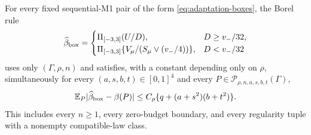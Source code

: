 \begin{proposition}
\label{prop:affine-histogram-adaptation}
For every fixed sequential-M1 pair of the form
\eqref{eq:adaptation-boxes}, the Borel rule
\begin{equation}
 \widehat\beta_{\rm box}=
 \begin{cases}
 \Pi_{[-3,3]}(U/D),&D\ge v_-/32,\\
 \Pi_{[-3,3]}\{V_\mu/(S_\mu\vee(v_-/4))\},&D<v_-/32
 \end{cases}
 \label{eq:adaptation-affine-rule}
\end{equation}
uses only $(\Gamma,\rho,n)$ and satisfies, with a constant depending
only on $\rho$, simultaneously for every $(a,s,b,t)\in[0,1]^4$ and
every $P\in\mathcal P_{\rho,n,a,s,b,t}(\Gamma)$,
\begin{equation}
 \mathbb E_P|\widehat\beta_{\rm box}-\beta(P)|
 \le C_\rho\{q+(a+s^2)(b+t^2)\}.
 \label{eq:adaptation-sharp-risk}
\end{equation}
This includes every $n\ge1$, every zero-budget boundary, and every
regularity tuple with a nonempty compatible-law class.
\end{proposition}

